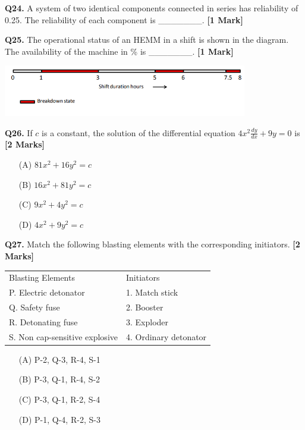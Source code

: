 \documentclass[11pt]{article}
\newcommand{\questiona}[2]{
    \noindent\textbf{Q#2.} #1 \hfill \textbf{[1 Mark]}
}
\newcommand{\questionb}[2]{
    \noindent\textbf{Q#2.} #1 \hfill \textbf{[2 Marks]}
}
\begin{document}
\questiona{A system of two identical components connected in series has reliability of 0.25. The reliability of each component is \_\_\_\_\_\_\_.}{24}
\vspace{0.5cm}

\questiona{The operational status of an HEMM in a shift is shown in the diagram. The availability of the machine in \% is \_\_\_\_\_\_\_.}{25}
\begin{center}
\includegraphics[width=0.8\textwidth]{figures/25.png}
\end{center}
\vspace{0.5cm}

\questionb{If \(c\) is a constant, the solution of the differential equation \(4x^2 \frac{dy}{dx} + 9y = 0\) is}{26}
\begin{enumerate}
    \item[(A)] \(81x^2 + 16y^2 = c\)
    \item[(B)] \(16x^2 + 81y^2 = c\)
    \item[(C)] \(9x^2 + 4y^2 = c\)
    \item[(D)] \(4x^2 + 9y^2 = c\)
\end{enumerate}
\vspace{0.5cm}

\questionb{Match the following blasting elements with the corresponding initiators.}{27}
\begin{tabular}{ll}
Blasting Elements & Initiators \\
P. Electric detonator & 1. Match stick \\
Q. Safety fuse & 2. Booster \\
R. Detonating fuse & 3. Exploder \\
S. Non cap-sensitive explosive & 4. Ordinary detonator \\
\end{tabular}

\begin{enumerate}
    \item[(A)] P-2, Q-3, R-4, S-1
    \item[(B)] P-3, Q-1, R-4, S-2
    \item[(C)] P-3, Q-1, R-2, S-4
    \item[(D)] P-1, Q-4, R-2, S-3
\end{enumerate}
\vspace{0.5cm}
\end{document}
